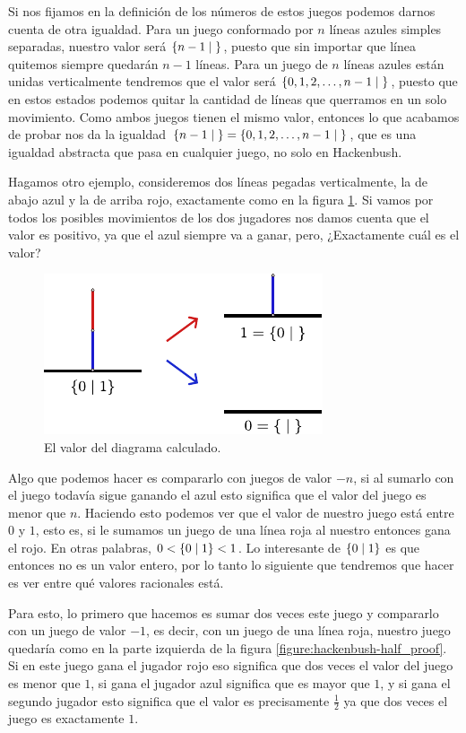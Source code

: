 Si nos fijamos en la definici\'on de los n\'umeros de estos juegos podemos darnos cuenta de otra igualdad. Para un juego conformado por $n$ l\'ineas azules simples separadas, nuestro valor ser\'a $\left\{n-1\;\middle|\; \right\}$, puesto que sin importar que l\'inea quitemos siempre quedar\'an $n-1$ l\'ineas. Para un juego de $n$ l\'ineas azules est\'an unidas verticalmente tendremos que el valor ser\'a $\left\{0,1,2,\dots,n-1\;\middle|\; \right\}$, puesto que en estos estados podemos quitar la cantidad de l\'ineas que querramos en un solo movimiento.
Como ambos juegos tienen el mismo valor, entonces lo que acabamos de probar nos da la igualdad $\left\{n-1\;\middle|\; \right\} = \left\{0,1,2,\dots,n-1\;\middle|\; \right\}$, que es una igualdad abstracta que pasa en cualquier juego, no solo en Hackenbush.

Hagamos otro ejemplo, consideremos dos l\'ineas pegadas verticalmente, la de abajo azul y la de arriba rojo, exactamente como en la figura \ref{figure:hackenbush-half}. Si vamos por todos los posibles movimientos de los dos jugadores nos damos cuenta que el valor es positivo, ya que el azul siempre va a ganar, pero, ¿Exactamente cu\'al es el valor?

\begin{figure}[h]
    \centering
    \includegraphics[width=.5\textwidth]{images/hackenbush-half_def.pdf}
    \caption{El valor del diagrama calculado.}
    \label{figure:hackenbush-half}
\end{figure}

Algo que podemos hacer es compararlo con juegos de valor $-n$, si al sumarlo con el juego todav\'ia sigue ganando el azul esto significa que el valor del juego es menor que $n$. Haciendo esto podemos ver que el valor de nuestro juego est\'a entre $0$ y $1$, esto es, si le sumamos un juego de una l\'inea roja al nuestro entonces gana el rojo. En otras palabras, $0 < \left\{0\;\middle|\; 1\right\} < 1$. Lo interesante de $\left\{0\;\middle|\; 1\right\}$ es que entonces no es un valor entero, por lo tanto lo siguiente que tendremos que hacer es ver entre qu\'e valores racionales est\'a.

Para esto, lo primero que hacemos es sumar dos veces este juego y compararlo con un juego de valor $-1$, es decir, con un juego de una l\'inea roja, nuestro juego quedar\'ia como en la parte izquierda de la figura \ref{figure:hackenbush-half_proof}. Si en este juego gana el jugador rojo eso significa que dos veces el valor del juego es menor que $1$, si gana el jugador azul significa que es mayor que $1$, y si gana el segundo jugador esto significa que el valor es precisamente $\frac{1}{2}$ ya que dos veces el juego es exactamente $1$.

